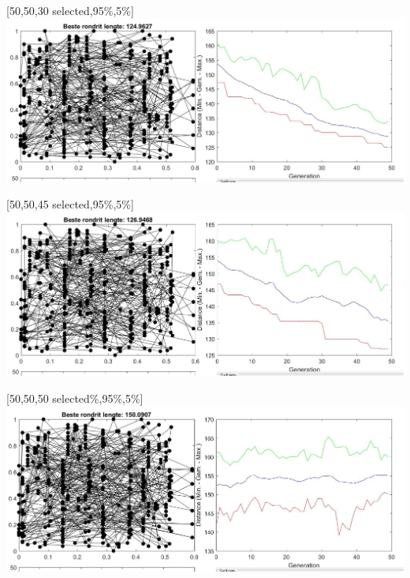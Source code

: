\begin{center}
[50,50,30 selected,95\%,5\%\big]\\
\includegraphics[width=15cm]{img/optional/optional_3.jpg}
\end{center}

\begin{center}
[50,50,45 selected,95\%,5\%]\\
\includegraphics[width=15cm]{img/optional/optional_4.jpg}
\end{center}

\begin{center}
[50,50,50 selected\%,95\%,5\%]\\
\includegraphics[width=15cm]{img/optional/optional_5.jpg}
\end{center}

